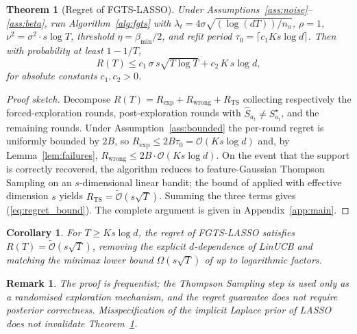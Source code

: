 \documentclass[10pt,journal,twoside,twocolumn]{IEEEtran}
\newtheorem{theorem}{Theorem}
\newtheorem{corollary}{Corollary}
\newtheorem{remark}{Remark}
\begin{document}
\begin{theorem}[Regret of FGTS-LASSO]\label{thm:main}
Under Assumptions~\ref{ass:noise}--\ref{ass:beta}, run Algorithm~\ref{alg:fgts} with $\lambda_t = 4\sigma\sqrt{(\log(dT))/n_a}$, $\rho = 1$, $\nu^2 = \sigma^2 \cdot s\log T$, threshold $\eta = \beta_{\min}/2$, and refit period $\tau_0 = \lceil c_1 K s\log d\rceil$. Then with probability at least $1 - 1/T$,
\begin{equation}
R(T) \leq c_1\, \sigma\, s\sqrt{T \log T} + c_2\, K\, s \log d,
\label{eq:regret_bound}
\end{equation}
for absolute constants $c_1, c_2 > 0$.
\end{theorem}

\begin{proof}[Proof sketch]
Decompose $R(T) = R_{\mathrm{exp}} + R_{\mathrm{wrong}} + R_{\mathrm{TS}}$ collecting respectively the forced-exploration rounds, post-exploration rounds with $\hat{S}_{a_t} \neq S^{\star}_{a_t}$, and the remaining rounds. Under Assumption~\ref{ass:bounded} the per-round regret is uniformly bounded by $2B$, so $R_{\mathrm{exp}} \leq 2B\tau_0 = \mathcal{O}(Ks\log d)$ and, by Lemma~\ref{lem:failures}, $R_{\mathrm{wrong}} \leq 2B \cdot \mathcal{O}(Ks\log d)$. On the event that the support is correctly recovered, the algorithm reduces to feature-Gaussian Thompson Sampling on an $s$-dimensional linear bandit; the bound of \cite[Thm.~3]{abeille2017linear} applied with effective dimension $s$ yields $R_{\mathrm{TS}} = \tilde{\mathcal{O}}(s\sqrt{T})$. Summing the three terms gives (\ref{eq:regret_bound}). The complete argument is given in Appendix~\ref{app:main}.
\end{proof}

\begin{corollary}\label{cor:rate}
For $T \geq Ks\log d$, the regret of FGTS-LASSO satisfies $R(T) = \tilde{\mathcal{O}}(s\sqrt{T})$, removing the explicit $d$-dependence of LinUCB and matching the minimax lower bound $\Omega(s\sqrt{T})$ of \cite[Thm.~1]{hao2020high} up to logarithmic factors.
\end{corollary}

\begin{remark}
The proof is frequentist; the Thompson Sampling step is used only as a randomised exploration mechanism, and the regret guarantee does not require posterior correctness. Misspecification of the implicit Laplace prior of LASSO does not invalidate Theorem~\ref{thm:main}.
\end{remark}
\end{document}
